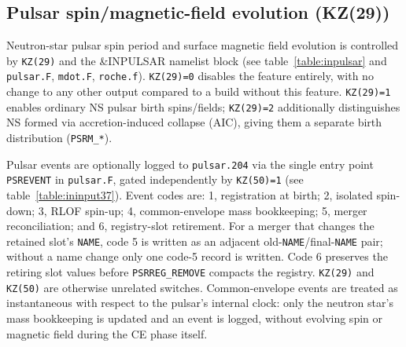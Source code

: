 \begin{landscape}
\begin{table}
			\caption{Table showing the options in the \texttt{SSE \& BSE} stellar evolution with respect to the parameters in \texttt{MOCCA}. The parameters used in the simulations of this study (\texttt{delayedSNe-Uniform \& rapidSNe-Sana}) are shown in \textcolor{orange}{orange}. The parameters that are present in \texttt{MOCCA} version but not in \texttt{Nbody6++GPU} are shown in \textcolor{red}{red} (the added CV and symbiotic star treatment by \cite{Bellonietal2018c,Belloni2020b} are not listed here). All the stellar evolution routines not listed here are largely identical to the original \texttt{SSE} and \texttt{BSE} \cite{Hurley2000, Hurley2002}. The abbreviations are as follows: \textbf{ECSNe} - eletron capture supernova, \textbf{AIC} - accretion-induced collapse, \textbf{MIC} - merger-induced collapse, \textbf{PPISNe} - pulsating pair instability supernova, \textbf{PISNe} - pair instability supernova, \textbf{LBV} - luminous blue variable, \textbf{NS} - neutron star, \textbf{BH} - black hole.}
			\label{MOCCA_Stellar_evolution_levels_literature}
		\end{table}
	\end{landscape}
	\endgroup


\subsection{Pulsar spin/magnetic-field evolution (KZ(29))}
\label{sec:pulsar}

Neutron-star pulsar spin period and surface magnetic field evolution is controlled by \texttt{KZ(29)} and the \&INPULSAR namelist block (see table~\ref{table:inpulsar} and \texttt{pulsar.F}, \texttt{mdot.F}, \texttt{roche.f}). \texttt{KZ(29)=0} disables the feature entirely, with no change to any other output compared to a build without this feature. \texttt{KZ(29)=1} enables ordinary NS pulsar birth spins/fields; \texttt{KZ(29)=2} additionally distinguishes NS formed via accretion-induced collapse (AIC), giving them a separate birth distribution (\texttt{PSRM\_*}).

Pulsar events are optionally logged to \texttt{pulsar.204} via the single entry point \texttt{PSREVENT} in \texttt{pulsar.F}, gated independently by \texttt{KZ(50)=1} (see table~\ref{table:ininput37}). Event codes are: 1, registration at birth; 2, isolated spin-down; 3, RLOF spin-up; 4, common-envelope mass bookkeeping; 5, merger reconciliation; and 6, registry-slot retirement. For a merger that changes the retained slot's \texttt{NAME}, code 5 is written as an adjacent old-\texttt{NAME}/final-\texttt{NAME} pair; without a name change only one code-5 record is written. Code 6 preserves the retiring slot values before \texttt{PSRREG\_REMOVE} compacts the registry. \texttt{KZ(29)} and \texttt{KZ(50)} are otherwise unrelated switches. Common-envelope events are treated as instantaneous with respect to the pulsar's internal clock: only the neutron star's mass bookkeeping is updated and an event is logged, without evolving spin or magnetic field during the CE phase itself.

